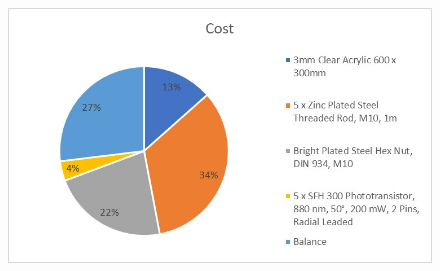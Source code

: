 \begin{figure}
    \includegraphics[width=\linewidth]{images/piechart.jpg}
    \caption{}
\end{figure}